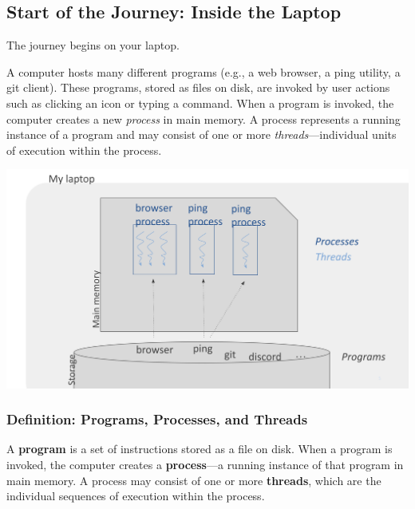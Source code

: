 \subsection{Start of the Journey: Inside the Laptop}
The journey begins on your laptop.\\[5px] 
\begin{minipage}{0.45\textwidth}
  \begin{justify}
    A computer hosts many different programs (e.g., a web browser, a ping utility, a git client). These programs, stored as files on disk, are invoked by user actions such as clicking an icon or typing a command. When a program is invoked, the computer creates a new \emph{process} in main memory. A process represents a running instance of a program and may consist of one or more \emph{threads}—individual units of execution within the process.
  \end{justify}
\end{minipage}
\hfill
\vline
\hfill
\begin{minipage}{0.45\textwidth}
  \begin{center}
  \includegraphics[width=1.3\textwidth]{chapters/L1/images/threads.png}
\end{center}
\end{minipage}

\subsubsection{Definition: Programs, Processes, and Threads}
\begin{definition}
A \textbf{program} is a set of instructions stored as a file on disk. When a program is invoked, the computer creates a \textbf{process}—a running instance of that program in main memory. A process may consist of one or more \textbf{threads}, which are the individual sequences of execution within the process.
\end{definition}

